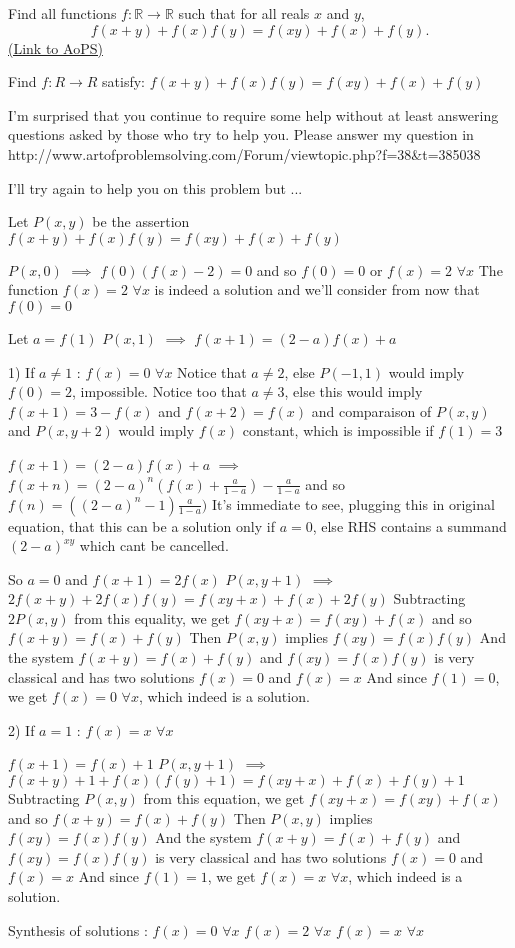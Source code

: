 \begin{problem}
	Find all functions $f: \mathbb R \to \mathbb R$ such that for all reals $x$ and $y$,
\[f(x+y)+f(x)f(y)=f(xy)+f(x)+f(y).\]
	\flushright \href{https://artofproblemsolving.com/community/c6h385670}{(Link to AoPS)}
\end{problem}



\begin{solution}
	\begin{tcolorbox}Find $f:R \to R$ satisfy:
$f(x+y)+f(x)f(y)=f(xy)+f(x)+f(y)$\end{tcolorbox}
I'm surprised that you continue to require some help without at least answering questions asked by those who try to help you. Please answer my question in http://www.artofproblemsolving.com/Forum/viewtopic.php?f=38&t=385038

I'll try again to help you on this problem but ...

Let $P(x,y)$ be the assertion $f(x+y)+f(x)f(y)=f(xy)+f(x)+f(y)$

$P(x,0)$ $\implies$ $f(0)(f(x)-2)=0$ and so $f(0)=0$ or $f(x)=2$ $\forall x$
The function $f(x)=2$ $\forall x$ is indeed a solution and we'll consider from now that $f(0)=0$

Let $a=f(1)$
$P(x,1)$ $\implies$ $f(x+1)=(2-a)f(x)+a$

1) If $a\ne 1$ : $f(x)=0$ $\forall x$
Notice that $a\ne 2$, else $P(-1,1)$ would imply $f(0)=2$, impossible.
Notice too that $a\ne 3$, else this would imply $f(x+1)=3-f(x)$ and $f(x+2)=f(x)$ and comparaison of $P(x,y)$ and $P(x,y+2)$ would imply $f(x)$ constant, which is impossible if $f(1)=3$

$f(x+1)=(2-a)f(x)+a$ $\implies$ $f(x+n)=(2-a)^n(f(x)+\frac a{1-a})-\frac a{1-a}$ and so $f(n)=((2-a)^n-1)\frac a{1-a})$
It's immediate to see, plugging this in original equation, that this can be a solution only if $a=0$, else RHS contains a summand $(2-a)^{xy}$ which cant be cancelled.

So $a=0$ and $f(x+1)=2f(x)$
$P(x,y+1)$ $\implies$ $2f(x+y)+2f(x)f(y)=f(xy+x)+f(x)+2f(y)$
Subtracting $2P(x,y)$ from this equality, we get $f(xy+x)=f(xy)+f(x)$ and so $f(x+y)=f(x)+f(y)$
Then $P(x,y)$ implies $f(xy)=f(x)f(y)$
And the system $f(x+y)=f(x)+f(y)$ and $f(xy)=f(x)f(y)$ is very classical and has two solutions $f(x)=0$ and $f(x)=x$
And since $f(1)=0$, we get $f(x)=0$ $\forall x$, which indeed is a solution.

2) If $a=1$ : $f(x)=x$ $\forall x$

$f(x+1)=f(x)+1$
$P(x,y+1)$ $\implies$ $f(x+y)+1+f(x)(f(y)+1)=f(xy+x)+f(x)+f(y)+1$
Subtracting $P(x,y)$ from this equation, we get $f(xy+x)=f(xy)+f(x)$ and so $f(x+y)=f(x)+f(y)$
Then $P(x,y)$ implies $f(xy)=f(x)f(y)$
And the system $f(x+y)=f(x)+f(y)$ and $f(xy)=f(x)f(y)$ is very classical and has two solutions $f(x)=0$ and $f(x)=x$
And since $f(1)=1$, we get $f(x)=x$ $\forall x$, which indeed is a solution.

Synthesis of solutions :
$f(x)=0$ $\forall x$
$f(x)=2$ $\forall x$
$f(x)=x$ $\forall x$
\end{solution}
